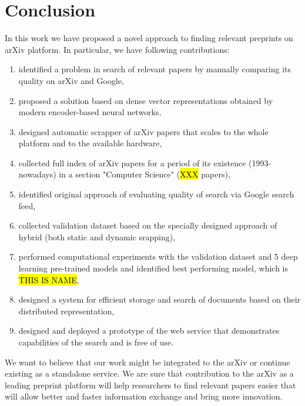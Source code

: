 \documentclass{article}
\begin{document}
\section{Conclusion}
    

    In this work we have proposed a novel approach to finding relevant preprints on arXiv platform. In particular, we have following contributions:
    
    \begin{enumerate}
        \item identified a problem in search of relevant papers by manually comparing its quality on arXiv and Google,
        \item proposed a solution based on dense vector representations obtained by modern encoder-based neural networks,
        \item designed automatic scrapper of arXiv papers that scales to the whole platform and to the available hardware,
        \item collected full index of arXiv papers for a period of its existence (1993-nowadays) in a section "Computer Science" (\hl{XXX} papers),
        \item identified original approach of evaluating quality of search via Google search feed,
        \item collected validation dataset based on the specially designed approach of hybrid (both static and dynamic srapping),
        \item performed computational experiments with the validation dataset and 5 deep learning pre-trained models and identified best performing model, which is \hl{THIS IS NAME},
        \item designed a system for efficient storage and search of documents based on their distributed representation,
        \item designed and deployed a prototype of the web service that demonstrates capabilities of the search and is free of use. 
    \end{enumerate}
    
    We want to believe that our work might be integrated to the arXiv or continue existing as a standalone service. We are sure that contribution to the arXiv as a leading preprint platform will help researchers to find relevant papers easier that will allow better and faster information exchange and bring more innovation. 



\end{document}
